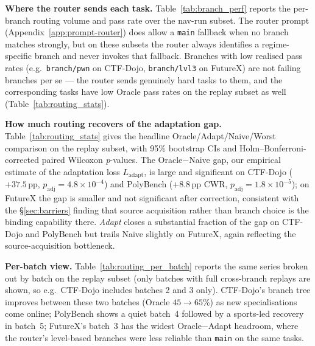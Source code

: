 \noindent\textbf{Where the router sends each task.}
Table~\ref{tab:branch_perf} reports the per-branch routing volume and pass rate over the nav-run subset. The router prompt (Appendix~\ref{app:prompt-router}) does allow a \texttt{main} fallback when no branch matches strongly, but on these subsets the router always identifies a regime-specific branch and never invokes that fallback. Branches with low realised pass rates (e.g.\ \texttt{branch/pwn} on CTF-Dojo, \texttt{branch/lvl3} on FutureX) are not failing branches per se --- the router sends genuinely hard tasks to them, and the corresponding tasks have low Oracle pass rates on the replay subset as well (Table~\ref{tab:routing_stats}).



\noindent\textbf{How much routing recovers of the adaptation gap.}
Table~\ref{tab:routing_stats} gives the headline Oracle/Adapt/Naive/Worst comparison on the replay subset, with 95\% bootstrap CIs and Holm--Bonferroni-corrected paired Wilcoxon \emph{p}-values. The Oracle$-$Naive gap, our empirical estimate of the adaptation loss $L_\mathrm{adapt}$, is large and significant on CTF-Dojo ($+37.5$\,pp, $p_\mathrm{adj}\!=\!4.8\times10^{-4}$) and PolyBench ($+8.8$\,pp CWR, $p_\mathrm{adj}\!=\!1.8\times10^{-5}$); on FutureX the gap is smaller and not significant after correction, consistent with the \S\ref{sec:barriers} finding that source acquisition rather than branch choice is the binding capability there. \emph{Adapt} closes a substantial fraction of the gap on CTF-Dojo and PolyBench but trails Naive slightly on FutureX, again reflecting the source-acquisition bottleneck.



\noindent\textbf{Per-batch view.}
Table~\ref{tab:routing_per_batch} reports the same series broken out by batch on the replay subset (only batches with full cross-branch replays are shown, so e.g.\ CTF-Dojo includes batches 2 and 3 only). CTF-Dojo's branch tree improves between these two batches (Oracle $45\!\to\!65$\%) as new specialisations come online; PolyBench shows a quiet batch~4 followed by a sports-led recovery in batch~5; FutureX's batch~3 has the widest Oracle$-$Adapt headroom, where the router's level-based branches were less reliable than \texttt{main} on the same tasks.



